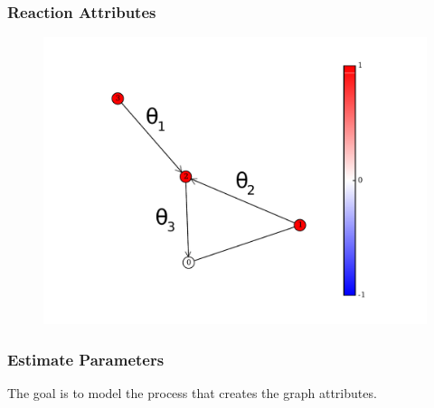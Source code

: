 \documentclass{beamer}
\begin{document}
\begin{frame}
\frametitle{Reaction Attributes}
\begin{figure}
\includegraphics[width=0.8\linewidth]{figs/reaction_graph}
\end{figure}
\end{frame}

\begin{frame}
\frametitle{Estimate Parameters}
The goal is to model the process that creates the graph attributes.
\end{frame}
\end{document}
